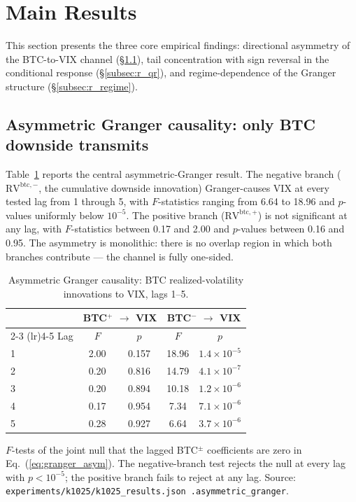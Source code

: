 \documentclass[11pt,a4paper]{article}
\begin{document}
\section{Main Results}
\label{sec:results}

This section presents the three core empirical findings: directional asymmetry of the BTC-to-VIX channel (\S\ref{subsec:r_asym}), tail concentration with sign reversal in the conditional response (\S\ref{subsec:r_qr}), and regime-dependence of the Granger structure (\S\ref{subsec:r_regime}).

\subsection{Asymmetric Granger causality: only BTC downside transmits}
\label{subsec:r_asym}

Table~\ref{tab:granger_asym} reports the central asymmetric-Granger result. The negative branch ($\text{RV}^{\text{btc},-}$, the cumulative downside innovation) Granger-causes VIX at every tested lag from 1 through 5, with $F$-statistics ranging from 6.64 to 18.96 and $p$-values uniformly below $10^{-5}$. The positive branch ($\text{RV}^{\text{btc},+}$) is not significant at any lag, with $F$-statistics between 0.17 and 2.00 and $p$-values between 0.16 and 0.95. The asymmetry is monolithic: there is no overlap region in which both branches contribute --- the channel is fully one-sided.%

\begin{table}[H]
\centering
\caption{Asymmetric Granger causality: BTC realized-volatility innovations to VIX, lags 1--5.}
\label{tab:granger_asym}
\begin{tabular}{lcccc}
\toprule
 & \multicolumn{2}{c}{BTC$^+$ $\to$ VIX} & \multicolumn{2}{c}{BTC$^-$ $\to$ VIX} \\
\cmidrule(lr){2-3} \cmidrule(lr){4-5}
Lag & $F$ & $p$ & $F$ & $p$ \\
\midrule
1 & 2.00 & 0.157 & 18.96 & $1.4 \times 10^{-5}$ \\
2 & 0.20 & 0.816 & 14.79 & $4.1 \times 10^{-7}$ \\
3 & 0.20 & 0.894 & 10.18 & $1.2 \times 10^{-6}$ \\
4 & 0.17 & 0.954 & 7.34  & $7.1 \times 10^{-6}$ \\
5 & 0.28 & 0.927 & 6.64  & $3.7 \times 10^{-6}$ \\
\bottomrule
\end{tabular}
\begin{flushleft}
\footnotesize $F$-tests of the joint null that the lagged BTC$^{\pm}$ coefficients are zero in Eq.~(\ref{eq:granger_asym}). The negative-branch test rejects the null at every lag with $p < 10^{-5}$; the positive branch fails to reject at any lag. Source: \texttt{experiments/k1025/k1025\_results.json .asymmetric\_granger}.
\end{flushleft}
\end{table}
\end{document}
